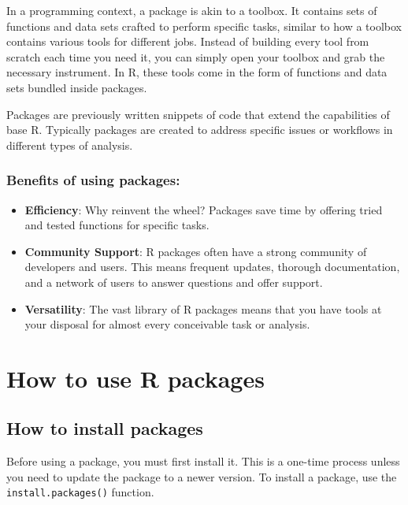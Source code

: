 \documentclass[
]{book}
\providecommand{\tightlist}{%
  \setlength{\itemsep}{0pt}\setlength{\parskip}{0pt}}
\begin{document}
In a programming context, a package is akin to a toolbox. It contains sets of functions and data sets crafted to perform specific tasks, similar to how a toolbox contains various tools for different jobs. Instead of building every tool from scratch each time you need it, you can simply open your toolbox and grab the necessary instrument. In R, these tools come in the form of functions and data sets bundled inside packages.

Packages are previously written snippets of code that extend the capabilities of base R. Typically packages are created to address specific issues or workflows in different types of analysis.

\hypertarget{benefits-of-using-packages}{%
\subsubsection{Benefits of using packages:}\label{benefits-of-using-packages}}

\begin{itemize}
\tightlist
\item
  \textbf{Efficiency}: Why reinvent the wheel? Packages save time by offering tried and tested functions for specific tasks.
\item
  \textbf{Community Support}: R packages often have a strong community of developers and users. This means frequent updates, thorough documentation, and a network of users to answer questions and offer support.
\item
  \textbf{Versatility}: The vast library of R packages means that you have tools at your disposal for almost every conceivable task or analysis.
\end{itemize}

\hypertarget{how-to-use-r-packages}{%
\section{How to use R packages}\label{how-to-use-r-packages}}

\hypertarget{how-to-install-packages}{%
\subsection{How to install packages}\label{how-to-install-packages}}

Before using a package, you must first install it. This is a one-time process unless you need to update the package to a newer version. To install a package, use the \texttt{install.packages()} function.
\end{document}
